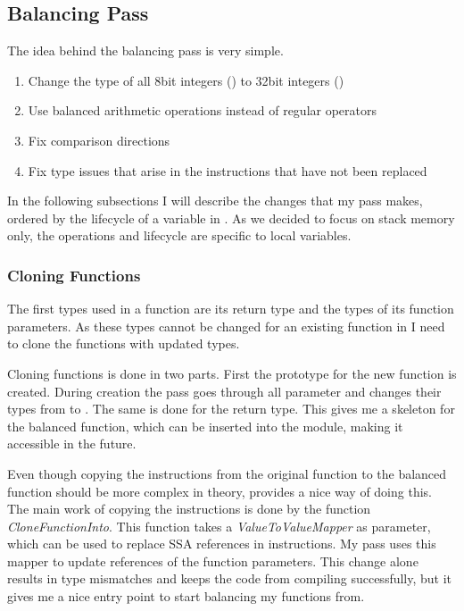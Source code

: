 \subsection{Balancing Pass}
\label{pass}
The idea behind the balancing pass is very simple.
\begin{enumerate}
\item Change the type of all 8bit integers () to 32bit integers ()
\item Use balanced arithmetic operations instead of regular operators
\item Fix comparison directions
\item Fix type issues that arise in the instructions that have not been replaced
\end{enumerate}

In the following subsections I will describe the changes that my pass makes, ordered by the lifecycle of a variable in \ir{}.
As we decided to focus on stack memory only, the operations and lifecycle are specific to local variables.

\subsubsection{Cloning Functions}
The first types used in a function are its return type and the types of its function parameters.
As these types cannot be changed for an existing function in \llvm{} I need to clone the functions with updated types.

Cloning functions is done in two parts.
First the prototype for the new function is created.
During creation the pass goes through all parameter and changes their types from  to .
The same is done for the return type.
This gives me a skeleton for the balanced function, which can be inserted into the module, making it accessible in the future.

Even though copying the instructions from the original function to the balanced function should be more complex in theory, \llvm{} provides a nice way of doing this.
The main work of copying the instructions is done by the \llvm{} function \emph{CloneFunctionInto}.
This function takes a \emph{ValueToValueMapper} as parameter, which can be used to replace SSA references in instructions.
My pass uses this mapper to update references of the function parameters.
This change alone results in type mismatches and keeps the code from compiling successfully, but it gives me a nice entry point to start balancing my functions from.

